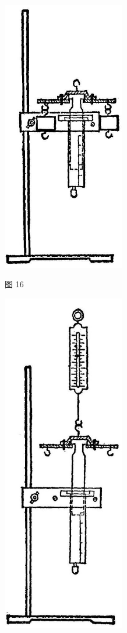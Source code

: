 \documentclass[10pt]{article}
\begin{document}
\begin{center}
\includegraphics[max width=0.4\textwidth]{images/01912d55-147c-70aa-b0e0-1782a122f948_340_880045.jpg}
\end{center}

图 16

\begin{center}
\includegraphics[max width=0.4\textwidth]{images/01912d55-147c-70aa-b0e0-1782a122f948_340_476296.jpg}
\end{center}
\end{document}
